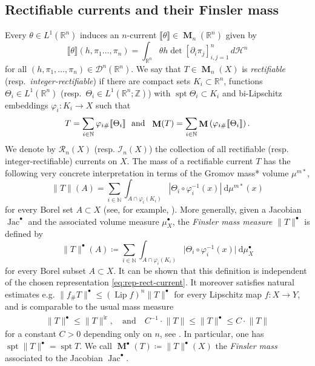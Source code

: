 \documentclass[reqno]{amsart}
\numberwithin{equation}{section}
\newcommand{\R}{\mathbb{R}}
\newcommand{\N}{\mathbb{N}}
\newcommand{\spt}{\operatorname{spt}}
\newcommand{\Lip}{\operatorname{Lip}}
\newcommand{\inv}{^{-1}}
\newcommand{\Jac}{\operatorname{Jac}}
\newcommand{\norm}[1]{\lVert#1\rVert}
\newcommand{\abs}[1]{\lvert#1\rvert}
\newcommand{\bb}[1]{\llbracket #1\rrbracket}
\newcommand{\susbet}{\subset}
\DeclareMathOperator{\mass}{\mathbf{M}}
\DeclareMathOperator{\ir}{ir}
\begin{document}
\subsection{Rectifiable currents and their Finsler mass}\label{sec:rectifiable_currents}
Every \(\theta \in L^1(\R^n)\) induces an \(n\)-current \(\bb{\theta}\in \mass_n(\R^n)\) given by
\[
\bb{\theta}(h,\pi_1 \dots, \pi_n)=\int_{\R^n} \theta h  \det [\partial_i \pi_j]^n_{i, j=1} \, d \mathcal{H}^n
\]
for all \((h, \pi_1, \dots, \pi_n)\in \mathcal{D}^n(\R^n)\). We say that $T\in \mass_n(X)$ is \emph{rectifiable} (resp.\ \emph{integer-rectifiable}) if there are compact sets $K_i \subset \mathbb{R}^n$, functions $\Theta_i \in L^1(\R^n)$ (resp.\ $\Theta_i \in L^1(\R^n; \mathbb{Z})$) 
with $\spt \Theta_i \subset K_i$ and bi-Lipschitz embeddings $\varphi_i \colon K_i \to X$ such that
\begin{equation}\label{eq:rep-rect-current}
T=\sum_{i\in \N} \varphi_{i\#} \bb{\Theta_i} \ \ \textnormal{and} \ \ \mass(T)=\sum_{i\in \N} \mass \left(\varphi_{i\#} \bb{\Theta_i}\right).
\end{equation}
We denote by $\mathcal{R}_n(X)$ (resp. $\mathcal{I}_n(X)$) the collection of all rectifiable (resp. integer-rectifiable) currents on $X$. The mass of a rectifiable current $T$ has the following very concrete interpretation in terms of the Gromov mass* volume $\mu^{m*}$,
\begin{equation}
\label{eq:mass*-characterization}
\norm{T}(A)=\sum_{i\in \N} \int_{A\cap \varphi_i(K_i)} \left|\Theta_i \circ \varphi^{-1}_i (x)\right|\ \textrm{d}\mu^{m*}(x)
\end{equation}
for every Borel set \(A\susbet X\) (see, for example, \cite[Lemma~2.5(2)]{zust2021riemannian}).  More generally, given a Jacobian $\Jac^\bullet$ and the associated volume measure $\mu_X^\bullet$, the \emph{Finsler mass measure} $\|T\|^\bullet$ is defined by 
\begin{equation}
\label{eq:Jacobian-mass-characterization}
\norm{T}^\bullet(A)\coloneqq\sum_{i\in \N} \int_{A\cap \varphi_i(K_i)} \abs{\Theta_i\circ \varphi_i\inv(x)} \ \textrm{d}\mu_X^\bullet
\end{equation}
for every Borel subset \(A\susbet X\). It can be shown that this definition is independent of the chosen representation \eqref{eq:rep-rect-current}. It moreover satisfies natural estimates e.g. \(\norm{f_\#T}^\bullet\le (\Lip f)^n\norm{T}^{\bullet}\) for every Lipschitz map \(f\colon X \to Y\), and is comparable to the usual mass measure
\begin{align*}
\norm{T}^{\bullet} \leq \norm{T}^{\ir},\quad\textrm{and}\quad C\inv\cdot\norm{T}\le \norm{T}^{\bullet}\le C\cdot\norm{T}
\end{align*}
for a constant $C>0$ depending only on $n$, see \cite[Lemma~2.5]{zust2021riemannian}. In particular, one has \(\spt \norm{T}^\bullet=\spt T\). We call \(\mass^\bullet(T)\coloneqq \norm{T}^\bullet(X)\) the \emph{Finsler mass} associated to the Jacobian $\Jac^\bullet$.
\end{document}
